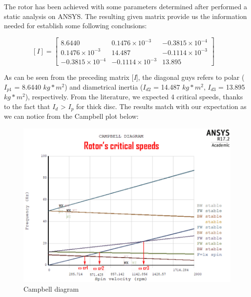 \vspace{5mm}
\noindent
The rotor has been achieved with some parameters determined after performed a static analysis on ANSYS. The resulting given matrix provide us the information needed for establish some following conclusions:

\begin{equation*}
\left[ I \right] = \begin{bmatrix} 8.6440 & 0.1476 \times 10^{-3} & -0.3815 \times 10^{-4} \\ 0.1476 \times 10^{-3} & 14.487 & -0.1114 \times 10^{-3} \\ -0.3815 \times 10^{-4} & -0.1114 \times 10^{-3} & 13.895
\end{bmatrix} \quad
\end{equation*}

\vspace{3mm}
\noindent
As can be seen from the preceding matrix [\textit{I}], the diagonal guys refers to polar ($I_{p1}$ = 8.6440 $kg*m^2$) and diametrical inertia ($I_{d2}$ = 14.487 $kg*m^2$, $I_{d3}$ = 13.895 $kg*m^2$), respectively. From the literature, we expected 4 critical speeds, thanks to the fact that $I_{d}$ > $I_{p}$ for thick disc.
The results match with our expectation as we can notice from the Campbell plot below: 

\medskip
\begin{figure}[h]
	\begin{center}
		\centering  		 		
		\includegraphics[width=1\linewidth]{PICTURES/5_Rotordynamics/campbell1.png}
	\end{center}
	\caption{Campbell diagram}
	\label{fig:critical speed} 
\end{figure}

